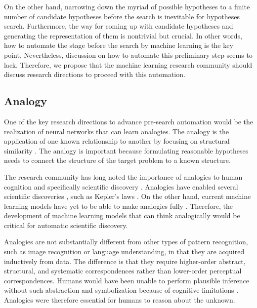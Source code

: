 \documentclass{article}
\begin{document}
On the other hand, narrowing down the myriad of possible hypotheses to a finite number of candidate hypotheses before the search is inevitable for hypotheses search. Furthermore, the way for coming up with candidate hypotheses and generating the representation of them \cite{bechtel1993discovering} is nontrivial but crucial. In other words, how to automate the stage before the search by machine learning is the key point. Nevertheless, discussion on how to automate this preliminary step seems to lack. Therefore, we propose that the machine learning research community should discuss research directions to proceed with this automation.

\subsection{Analogy}
\label{section:analogy}
One of the key research directions to advance pre-search automation would be the realization of neural networks that can learn analogies. The analogy is the application of one known relationship to another by focusing on structural similarity \cite{analogy}. The analogy is important because formulating reasonable hypotheses needs to connect the structure of the target problem to a known structure. 

The research community has long noted the importance of analogies \cite{analogy} to human cognition \cite{gentner1983structure,holyoak1984analogical} and specifically scientific discovery \cite{hesse1965models,thagard_1984,gentner1993shift,holyoak1996mental,dunbar1997scientists}. Analogies have enabled several scientific discoveries \cite{hofstadter2013surfaces}, such as Kepler's laws \cite{gentner2002analogy}. On the other hand, current machine learning models have yet to be able to make analogies fully \cite{mitchell2021abstraction}. Therefore, the development of machine learning models that can think analogically would be critical for automatic scientific discovery.
 
Analogies are not substantially different from other types of pattern recognition, such as image recognition or language understanding, in that they are acquired inductively from data. The difference is that they require higher-order abstract, structural, and systematic correspondences rather than lower-order perceptual correspondences. Humans would have been unable to perform plausible inference without such abstraction and symbolization because of cognitive limitations \cite{feldman2016simplicity}. Analogies were therefore essential for humans to reason about the unknown.
\end{document}
